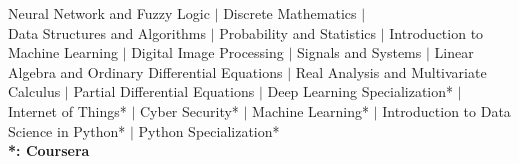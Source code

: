 
Neural Network and Fuzzy Logic $|$ Discrete Mathematics $|$ \\
Data Structures and Algorithms $|$ Probability and Statistics $|$
Introduction to Machine Learning $|$ Digital Image Processing $|$ Signals and Systems $|$ Linear Algebra and Ordinary Differential Equations $|$ Real Analysis and Multivariate Calculus $|$ Partial Differential Equations $|$ Deep Learning Specialization* $|$ Internet of Things* $|$ Cyber Security* $|$ Machine Learning* $|$ Introduction to Data Science in Python* $|$ Python Specialization*\\
\hfill\textbf{*: Coursera}
